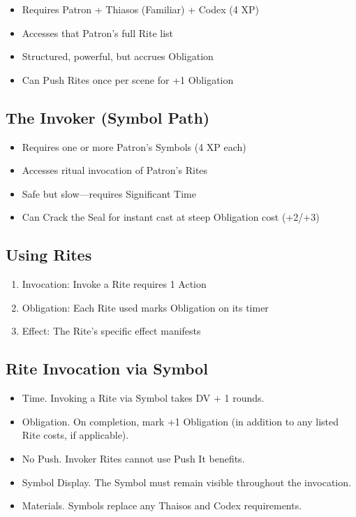 \documentclass[11pt,twoside,openany]{book}
\begin{document}
\begin{itemize}
\item Requires Patron + Thiasos (Familiar) + Codex (4 XP)
\item Accesses that Patron's full Rite list
\item Structured, powerful, but accrues Obligation
\item Can Push Rites once per scene for +1 Obligation
\end{itemize}

\subsection*{The Invoker (Symbol Path)}

\begin{itemize}
\item Requires one or more Patron's Symbols (4 XP each)
\item Accesses ritual invocation of Patron's Rites
\item Safe but slow---requires Significant Time
\item Can Crack the Seal for instant cast at steep Obligation cost (+2/+3)
\end{itemize}

\subsection*{Using Rites}

\begin{enumerate}
\item Invocation: Invoke a Rite requires 1 Action
\item Obligation: Each Rite used marks Obligation on its timer
\item Effect: The Rite's specific effect manifests
\end{enumerate}

\subsection*{Rite Invocation via Symbol}

\begin{itemize}
\item Time. Invoking a Rite via Symbol takes DV + 1 rounds.
\item Obligation. On completion, mark +1 Obligation (in addition to any listed Rite costs, if applicable).
\item No Push. Invoker Rites cannot use Push It benefits.
\item Symbol Display. The Symbol must remain visible throughout the invocation.
\item Materials. Symbols replace any Thaisos and Codex requirements.
\end{itemize}
\end{document}
